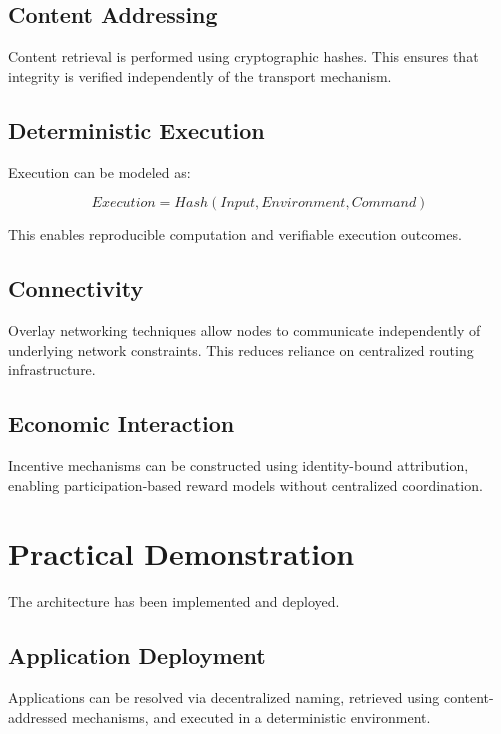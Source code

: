 \documentclass[11pt,a4paper]{article}
\begin{document}
\subsection{Content Addressing}

Content retrieval is performed using cryptographic hashes. This ensures that integrity is verified independently of the transport mechanism.

\subsection{Deterministic Execution}

Execution can be modeled as:

\begin{equation}
Execution = Hash(Input, Environment, Command)
\end{equation}

This enables reproducible computation and verifiable execution outcomes.

\subsection{Connectivity}

Overlay networking techniques allow nodes to communicate independently of underlying network constraints. This reduces reliance on centralized routing infrastructure.

\subsection{Economic Interaction}

Incentive mechanisms can be constructed using identity-bound attribution, enabling participation-based reward models without centralized coordination.

\section{Practical Demonstration}

The architecture has been implemented and deployed.

\subsection{Application Deployment}

Applications can be resolved via decentralized naming, retrieved using content-addressed mechanisms, and executed in a deterministic environment.
\end{document}
